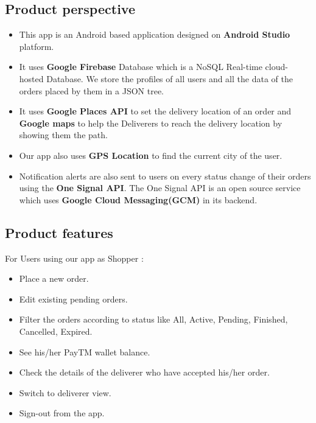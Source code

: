 \documentclass{report}
\begin{document}
\subsection{Product perspective}

\begin{itemize}[label=$\circ$]
\item This app is an Android based application designed on \textbf{Android Studio} platform.
\item It uses \textbf{Google Firebase} Database which is a NoSQL Real-time cloud-hosted Database. We store the profiles of all users and all the data of the orders placed by them in a JSON tree. 
\item It uses \textbf{Google Places API} to set the delivery location of an order and \textbf{Google maps} to help the Deliverers to reach the delivery location by showing them the path. 
\item Our app also uses \textbf{GPS Location} to find the current city of the user. 
\item Notification alerts are also sent to users on every status change of their orders using the \textbf{One Signal API}. The One Signal API  is an open source service which uses \textbf{Google Cloud Messaging(GCM)} in its backend.
\end{itemize}

\subsection{Product features}

For Users using our app as Shopper :
\begin{itemize}[label=$\circ$]
\item Place a new order.
\item Edit existing pending orders.
\item Filter the orders according to status like All, Active, Pending, Finished, Cancelled, Expired.
\item See his/her PayTM wallet balance.
\item Check the details of the deliverer who have accepted his/her order.
\item Switch to deliverer view.
\item Sign-out from the app.
\end{itemize}
\end{document}
